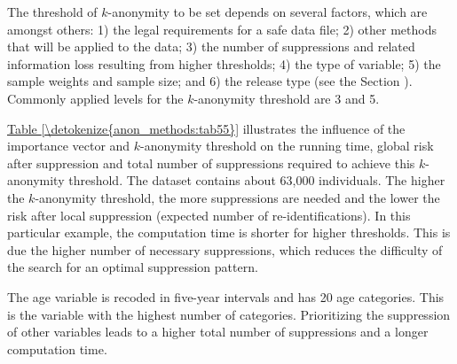 \documentclass[letterpaper,10pt,english]{sphinxmanual}
\begin{document}
The threshold of \(k\)-anonymity to be set depends on several
factors, which are amongst others: 1) the legal requirements for a safe
data file; 2) other methods that will be applied to the data; 3) the
number of suppressions and related information loss resulting from
higher thresholds; 4) the type of variable; 5) the sample weights and
sample size; and 6) the release type (see the Section  ).
Commonly applied levels for the \(k\)-anonymity threshold are 3 and 5.

\hyperref[\detokenize{anon_methods:tab55}]{Table \ref{\detokenize{anon_methods:tab55}}} illustrates the influence of the importance vector and
\(k\)-anonymity threshold on the running time, global risk after
suppression and total number of suppressions required to achieve this
\(k\)-anonymity threshold. The dataset contains about 63,000
individuals. The higher the \(k\)-anonymity threshold, the more
suppressions are needed and the lower the risk after local suppression
(expected number of re-identifications). In this particular example, the
computation time is shorter for higher thresholds. This is due the
higher number of necessary suppressions, which reduces the difficulty of
the search for an optimal suppression pattern.

The age variable is recoded in five-year intervals and has 20 age
categories. This is the variable with the highest number of categories.
Prioritizing the suppression of other variables leads to a higher total
number of suppressions and a longer computation time.
\end{document}
